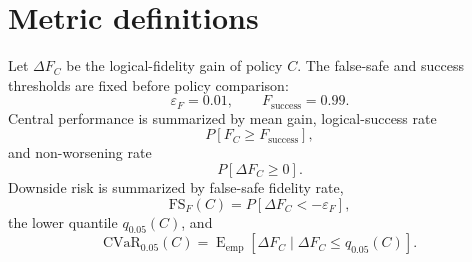 \documentclass[11pt]{article}
\numberwithin{equation}{section}
\begin{document}
\FloatBarrier

\section{Metric definitions}

Let $\Delta F_C$ be the logical-fidelity gain of policy $C$. The false-safe and
success thresholds are fixed before policy comparison:
\begin{equation}
\varepsilon_F=0.01,\qquad F_{\mathrm{success}}=0.99 .
\end{equation}
Central performance is summarized by mean gain, logical-success rate
\begin{equation}
P[F_C\ge F_{\mathrm{success}}],
\end{equation}
and non-worsening rate
\begin{equation}
P[\Delta F_C\ge 0].
\end{equation}
Downside risk is summarized by false-safe fidelity rate,
\begin{equation}
\mathrm{FS}_F(C)=P[\Delta F_C<-\varepsilon_F],
\end{equation}
the lower quantile $q_{0.05}(C)$, and
\begin{equation}
\mathrm{CVaR}_{0.05}(C)
=
\operatorname{E}_{\mathrm{emp}}[\Delta F_C\mid \Delta F_C\le q_{0.05}(C)].
\end{equation}
\end{document}
